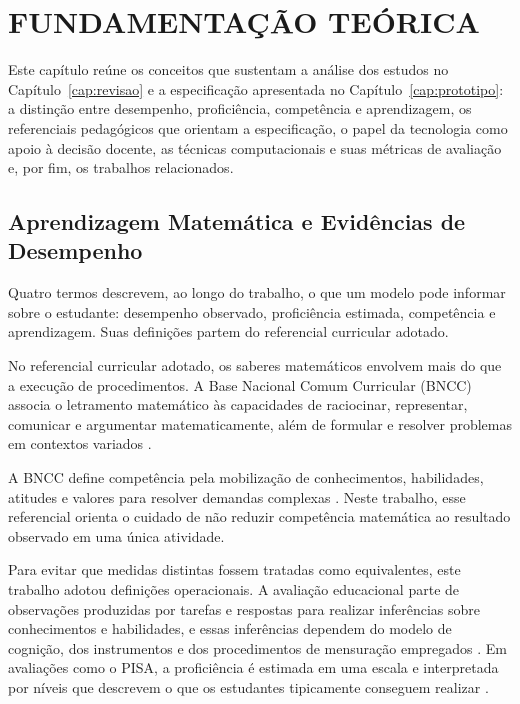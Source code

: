 \chapter{FUNDAMENTAÇÃO TEÓRICA}
\label{cap:fundamentacao}

Este capítulo reúne os conceitos que sustentam a análise dos estudos no Capítulo~\ref{cap:revisao} e a especificação apresentada no Capítulo~\ref{cap:prototipo}: a distinção entre desempenho, proficiência, competência e aprendizagem, os referenciais pedagógicos que orientam a especificação, o papel da tecnologia como apoio à decisão docente, as técnicas computacionais e suas métricas de avaliação e, por fim, os trabalhos relacionados.

\section{Aprendizagem Matemática e Evidências de Desempenho}
\label{sec:fund-evidencias}

Quatro termos descrevem, ao longo do trabalho, o que um modelo pode informar sobre o estudante: desempenho observado, proficiência estimada, competência e aprendizagem. Suas definições partem do referencial curricular adotado.

No referencial curricular adotado, os saberes matemáticos envolvem mais do que a execução de procedimentos. A Base Nacional Comum Curricular (BNCC) associa o letramento matemático às capacidades de raciocinar, representar, comunicar e argumentar matematicamente, além de formular e resolver problemas em contextos variados \cite{BNCC2018}.

A BNCC define competência pela mobilização de conhecimentos, habilidades, atitudes e valores para resolver demandas complexas \cite{BNCC2018}. Neste trabalho, esse referencial orienta o cuidado de não reduzir competência matemática ao resultado observado em uma única atividade.

Para evitar que medidas distintas fossem tratadas como equivalentes, este trabalho adotou definições operacionais. A avaliação educacional parte de observações produzidas por tarefas e respostas para realizar inferências sobre conhecimentos e habilidades, e essas inferências dependem do modelo de cognição, dos instrumentos e dos procedimentos de mensuração empregados \cite{NRC2001}. Em avaliações como o PISA, a proficiência é estimada em uma escala e interpretada por níveis que descrevem o que os estudantes tipicamente conseguem realizar \cite{OECDPISA2022Framework}.


